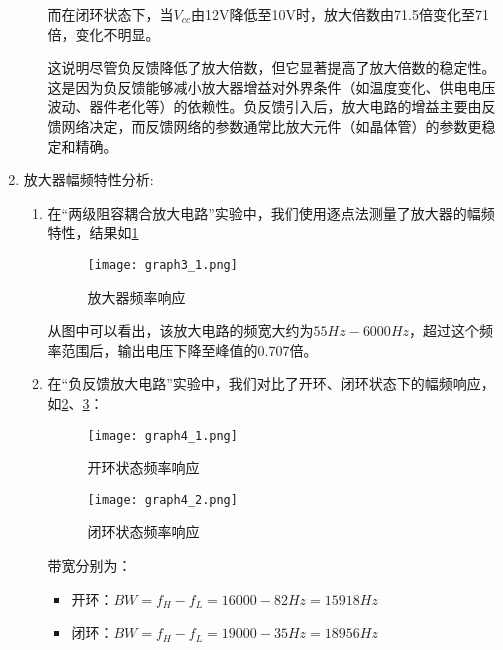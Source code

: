 \documentclass[dvipsnames, svgnames,a4paper,11pt]{article}
\begin{document}
\begin{enumerate}
\begin{itemize}
								而在闭环状态下，当$V_{cc}$由12V降低至10V时，放大倍数由71.5倍变化至71倍，变化不明显。

								这说明尽管负反馈降低了放大倍数，但它显著提高了放大倍数的稳定性。这是因为负反馈能够减小放大器增益对外界条件（如温度变化、供电电压波动、器件老化等）的依赖性。负反馈引入后，放大电路的增益主要由反馈网络决定，而反馈网络的参数通常比放大元件（如晶体管）的参数更稳定和精确。
					\end{itemize}
				
				

				
			

				\item 放大器幅频特性分析:
				
					\begin{enumerate}
						\item 在“两级阻容耦合放大电路”实验中，我们使用逐点法测量了放大器的幅频特性，结果如\cref{fig:fig3_1}
						
							\begin{figure}[htbp]
								\centering
								\texttt{[image: graph3\_1.png]}
								\caption{放大器频率响应}
								\label{fig:fig3_1}
							\end{figure}

							从图中可以看出，该放大电路的频宽大约为$55Hz - 6000Hz$，超过这个频率范围后，输出电压下降至峰值的0.707倍。

						\item 在“负反馈放大电路”实验中，我们对比了开环、闭环状态下的幅频响应，如\cref{fig:fig4_1}、\cref{fig:fig4_2}：
						
							\begin{figure}[htbp]
								\centering
								\texttt{[image: graph4\_1.png]}
								\caption{开环状态频率响应}
								\label{fig:fig4_1}
							\end{figure}

							\begin{figure}[htbp]
								\centering
								\texttt{[image: graph4\_2.png]}
								\caption{闭环状态频率响应}
								\label{fig:fig4_2}
							\end{figure}

							带宽分别为：
								\begin{itemize}
									\item 开环：$BW = f_H - f_L = 16000 - 82 Hz = 15918Hz$
									\item 闭环：$BW = f_H - f_L = 19000 - 35 Hz = 18956Hz$
								\end{itemize}


\end{enumerate}
\end{enumerate}
\end{document}
